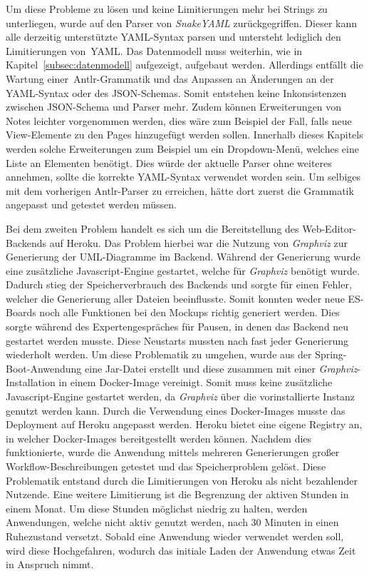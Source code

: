 Um diese Probleme zu lösen und keine Limitierungen mehr bei Strings zu unterliegen, wurde auf den Parser von \textit{SnakeYAML} zurückgegriffen.
Dieser kann alle derzeitig unterstützte YAML-Syntax parsen und untersteht lediglich den Limitierungen von~\ac{YAML}.
Das Datenmodell muss weiterhin, wie in Kapitel~\ref{subsec:datenmodell} aufgezeigt, aufgebaut werden.
Allerdings entfällt die Wartung einer~\ac{Antlr}-Grammatik und das Anpassen an Änderungen an der \ac{YAML}-Syntax oder des JSON-Schemas.
Somit entstehen keine Inkonsistenzen zwischen JSON-Schema und Parser mehr.
Zudem können Erweiterungen von Notes leichter vorgenommen werden, dies wäre zum Beispiel der Fall, falls neue View-Elemente zu den Pages hinzugefügt
werden sollen.
Innerhalb dieses Kapitels werden solche Erweiterungen zum Beispiel um ein Dropdown-Menü, welches eine Liste an Elementen benötigt.
Dies würde der aktuelle Parser ohne weiteres annehmen, sollte die korrekte \ac{YAML}-Syntax verwendet worden sein.
Um selbiges mit dem vorherigen \ac{Antlr}-Parser zu erreichen, hätte dort zuerst die Grammatik angepasst und getestet werden müssen.

Bei dem zweiten Problem handelt es sich um die Bereitstellung des Web-Editor-Backends auf Heroku.
Das Problem hierbei war die Nutzung von \textit{Graphviz} zur Generierung der \ac{UML}-Diagramme im Backend.
Während der Generierung wurde eine zusätzliche Javascript-Engine gestartet, welche für \textit{Graphviz} benötigt wurde.
Dadurch stieg der Speicherverbrauch des Backends und sorgte für einen Fehler, welcher die Generierung aller Dateien beeinflusste.
Somit konnten weder neue \ac{ES}-Boards noch alle Funktionen bei den Mockups richtig generiert werden.
Dies sorgte während des Expertengespräches für Pausen, in denen das Backend neu gestartet werden musste.
Diese Neustarts mussten nach fast jeder Generierung wiederholt werden.
Um diese Problematik zu umgehen, wurde aus der Spring-Boot-Anwendung eine Jar-Datei erstellt und diese zusammen mit einer \textit{Graphviz}-Installation in einem Docker-Image
vereinigt\cite*{size-problem}.
Somit muss keine zusätzliche Javascript-Engine gestartet werden, da \textit{Graphviz} über die vorinstallierte Instanz genutzt werden kann.
Durch die Verwendung eines Docker-Images musste das Deployment auf Heroku angepasst werden.
Heroku bietet eine eigene Registry an, in welcher Docker-Images bereitgestellt werden können\cite*{heroku-registry}.
Nachdem dies funktionierte, wurde die Anwendung mittels mehreren Generierungen großer Workflow-Beschreibungen getestet und das Speicherproblem gelöst.
Diese Problematik entstand durch die Limitierungen von Heroku als nicht bezahlender Nutzende\cite*{size-problem}.
Eine weitere Limitierung ist die Begrenzung der aktiven Stunden in einem Monat.
Um diese Stunden möglichst niedrig zu halten, werden Anwendungen, welche nicht aktiv genutzt werden, nach 30 Minuten in einen Ruhezustand versetzt.
Sobald eine Anwendung wieder verwendet werden soll, wird diese Hochgefahren, wodurch das initiale Laden der Anwendung etwas Zeit in Anspruch nimmt\cite*{heroku-limits}.

